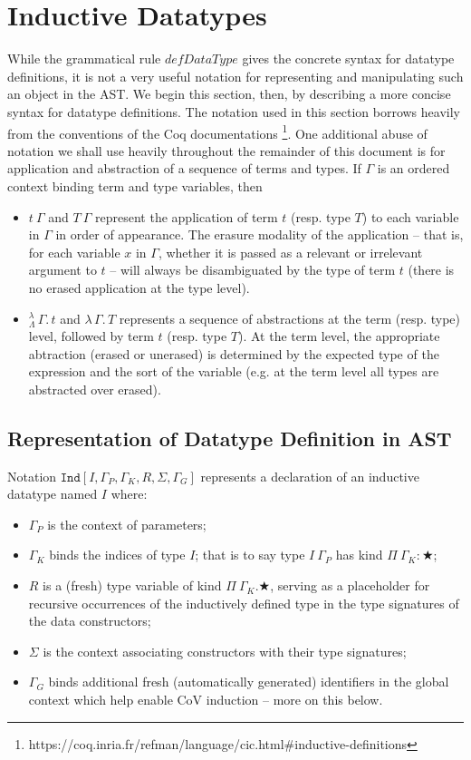 \documentclass{article}
\newcommand{\absu}[3]{{#1}\, #2.\, #3}
\newcommand{\indsche}[6]{\texttt{Ind}[#1,#2,#3,#4,#5,#6]}
\newcommand{\lamLam}{^{\lambda}_{\Lambda}}
\begin{document}
\section{Inductive Datatypes}
\label{sec:ind-data}

While the grammatical rule $defDataType$ gives the concrete syntax for datatype
definitions, it is not a very useful notation for representing and manipulating
such an object in the AST. We begin this section, then, by describing a more
concise syntax for datatype definitions. The notation used in this section
borrows heavily from the conventions of the Coq documentations
\footnote{https://coq.inria.fr/refman/language/cic.html\#inductive-definitions}.
One additional abuse of notation we shall use heavily throughout the remainder
of this document is for application and abstraction of a sequence of terms and
types. If $\Gamma$ is an ordered context binding term and type variables, then

\begin{itemize}
\item $t\ \Gamma$ and $T\ \Gamma$ represent the application of term $t$ (resp.
  type $T$) to each variable in $\Gamma$ in order of appearance. The erasure
  modality of the application -- that is, for each variable $x$ in $\Gamma$,
  whether it is passed as a relevant or irrelevant argument to $t$ -- will
  always be disambiguated by the type of term $t$ (there is no erased
  application at the type level).
\item $\absu{\lamLam}{\Gamma}{t}$ and $\absu{\lambda}{\Gamma}{T}$ represents a
  sequence of abstractions at the term (resp. type) level, followed by term $t$
  (resp. type $T$). At the term level, the appropriate abtraction (erased or
  unerased) is determined by the expected type of the expression and the sort
  of the variable (e.g. at the term level all types are abstracted over erased).
\end{itemize}

\subsection{Representation of Datatype Definition in AST}

Notation $\indsche{I}{\Gamma_P}{\Gamma_K}{R}{\Sigma}{\Gamma_G}$ represents a declaration of
an inductive datatype named $I$ where:
\begin{itemize}
\item $\Gamma_P$ is the context of parameters;
\item $\Gamma_K$ binds the indices of type $I$; that is to say type $I\ \Gamma_P$ has kind
  $Π\ \Gamma_K: ★$;
\item $R$ is a (fresh) type variable of kind $Π\ \Gamma_K. ★$, serving as a placeholder for
  recursive occurrences of the inductively defined type in the type signatures
  of the data constructors;
\item $\Sigma$ is the context associating constructors with their type
  signatures;
\item $\Gamma_G$ binds additional fresh (automatically generated) identifiers in
  the global context which help enable CoV induction -- more on this below.
\end{itemize}
\end{document}

